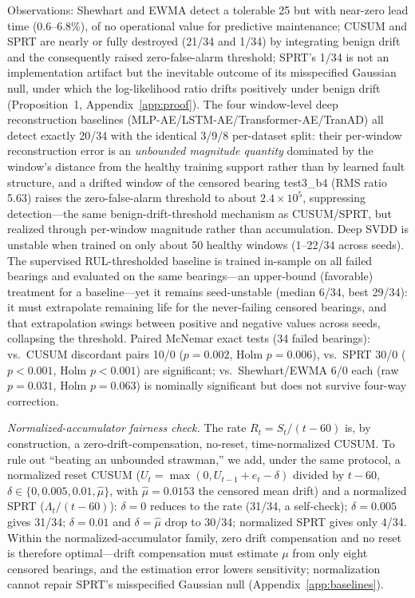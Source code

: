\documentclass[journal]{IEEEtran}
\begin{document}
Observations: Shewhart and EWMA detect a tolerable 25 but with near-zero lead time (0.6--6.8\%), of no operational value for predictive maintenance; CUSUM and SPRT are nearly or fully destroyed (21/34 and 1/34) by integrating benign drift and the consequently raised zero-false-alarm threshold; SPRT's 1/34 is not an implementation artifact but the inevitable outcome of its misspecified Gaussian null, under which the log-likelihood ratio drifts positively under benign drift (Proposition~1, Appendix~\ref{app:proof}). The four window-level deep reconstruction baselines (MLP-AE/LSTM-AE/Transformer-AE/TranAD) all detect exactly 20/34 with the identical 3/9/8 per-dataset split: their per-window reconstruction error is an \emph{unbounded magnitude quantity} dominated by the window's distance from the healthy training support rather than by learned fault structure, and a drifted window of the censored bearing test3\_b4 (RMS ratio 5.63) raises the zero-false-alarm threshold to about $2.4\times10^{5}$, suppressing detection---the same benign-drift-threshold mechanism as CUSUM/SPRT, but realized through per-window magnitude rather than accumulation. Deep SVDD is unstable when trained on only about 50 healthy windows (1--22/34 across seeds). The supervised RUL-thresholded baseline is trained in-sample on all failed bearings and evaluated on the same bearings---an upper-bound (favorable) treatment for a baseline---yet it remains seed-unstable (median 6/34, best 29/34): it must extrapolate remaining life for the never-failing censored bearings, and that extrapolation swings between positive and negative values across seeds, collapsing the threshold. Paired McNemar exact tests (34 failed bearings): vs.\ CUSUM discordant pairs 10/0 ($p=0.002$, Holm $p=0.006$), vs.\ SPRT 30/0 ($p<0.001$, Holm $p<0.001$) are significant; vs.\ Shewhart/EWMA 6/0 each (raw $p=0.031$, Holm $p=0.063$) is nominally significant but does not survive four-way correction.

\emph{Normalized-accumulator fairness check.} The rate $R_t=S_t/(t-60)$ is, by construction, a zero-drift-compensation, no-reset, time-normalized CUSUM. To rule out ``beating an unbounded strawman,'' we add, under the same protocol, a normalized reset CUSUM ($U_t=\max(0,U_{t-1}+e_t-\delta)$ divided by $t-60$, $\delta\in\{0,0.005,0.01,\hat\mu\}$, with $\hat\mu=0.0153$ the censored mean drift) and a normalized SPRT ($\Lambda_t/(t-60)$): $\delta=0$ reduces to the rate (31/34, a self-check); $\delta=0.005$ gives 31/34; $\delta=0.01$ and $\delta=\hat\mu$ drop to 30/34; normalized SPRT gives only 4/34. Within the normalized-accumulator family, zero drift compensation and no reset is therefore optimal---drift compensation must estimate $\mu$ from only eight censored bearings, and the estimation error lowers sensitivity; normalization cannot repair SPRT's misspecified Gaussian null (Appendix~\ref{app:baselines}).
\end{document}
